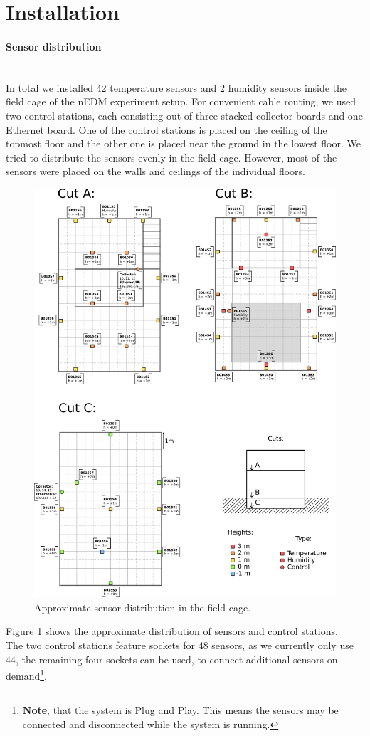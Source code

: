 \documentclass[a4paper]{scrreprt}
\begin{document}
\section{Installation}
\paragraph{Sensor distribution}\hspace{1cm}\\
In total we installed 42 temperature sensors and 2 humidity sensors inside the field
cage of the nEDM experiment setup. For convenient cable routing, we used
two control stations, each consisting out of three stacked collector boards and one
Ethernet board. One of the control stations is placed on the ceiling of the
topmost floor and the other one is placed near the ground in the lowest floor. We tried
to distribute the sensors evenly in the field cage. However, most
of the sensors were placed on the walls and ceilings of the individual floors. 
\begin{figure}
	\centering
	\includegraphics[width=\textwidth]{img/installPlan.pdf}
  \caption{Approximate sensor distribution in the field cage.}
	\label{fig:install}
\end{figure}
Figure
\ref{fig:install} shows the approximate distribution of sensors and control stations.\\
The two control stations feature sockets for 48 sensors, as we currently only use 44,
the remaining four sockets can be used, to connect additional sensors on demand\footnote{\textbf{Note}, that
the system is Plug and Play. This means the sensors may be connected and disconnected
while the system is running.}.\\
\end{document}
